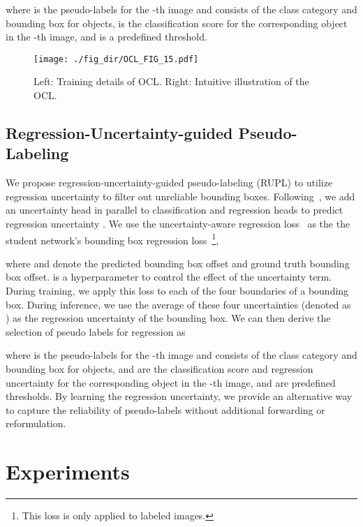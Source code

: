 \documentclass{bmvc2k}
\begin{document}
where
  is the  pseudo-labels for the -th image and consists of the class category
and bounding box
for objects,
 is the classification score for the corresponding object in the -th image, and  is a predefined threshold. 
\begin{figure}[t]
    \centering
    \texttt{[image: ./fig\_dir/OCL\_FIG\_15.pdf]}
    \caption{Left: Training details of OCL. Right: Intuitive illustration of the OCL.
}
    \label{fig:ocl_toy_example}
\end{figure}

\subsection{Regression-Uncertainty-guided Pseudo-Labeling}
\label{sec:uncertainty}

We propose regression-uncertainty-guided pseudo-labeling (RUPL) to utilize regression uncertainty to filter out unreliable bounding boxes. Following~\cite{box_regression_uncertainty}, we add an uncertainty head in parallel to classification and regression heads to predict regression uncertainty .
We use the uncertainty-aware regression loss~\cite{whatUncertainty} as the the student network's bounding box regression loss~\footnote{This loss is only applied to labeled images.},

where  and  denote the predicted bounding box offset and ground truth bounding box offset.
 is a hyperparameter to control the effect of the uncertainty term.
During training, we apply this loss to each of the four boundaries of a bounding box. During inference, we use the average of these four uncertainties (denoted as ) as the regression uncertainty of the bounding box. 
We can then derive the selection of pseudo labels for regression as

where
  is the  pseudo-labels for the -th image and consists of the class category and bounding box for objects,
 and  are the classification score and regression uncertainty for the corresponding object in the -th image, and   are predefined thresholds. 
By learning the regression uncertainty, we provide an alternative way to capture the reliability of pseudo-labels without additional forwarding or reformulation. 

\section{Experiments}
\label{sec:exper}
\end{document}
